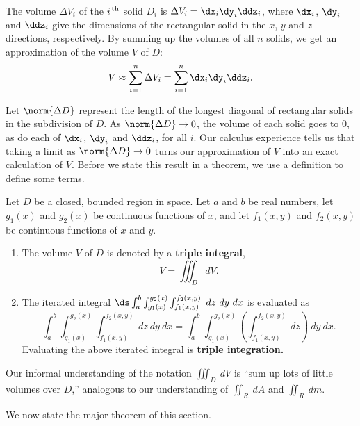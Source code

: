 The volume $\Delta V_i$ of the $i^\text{\,th}$ solid $D_i$ is $\Delta V_i = \dx_i\dy_i\ddz_i$, where $\dx_i$, $\dy_i$ and $\ddz_i$ give the dimensions of the rectangular solid in the $x$, $y$ and $z$ directions, respectively. By summing up the volumes of all $n$ solids, we get an approximation of the volume $V$ of $D$:
$$V \approx \sum_{i=1}^n \Delta V_i = \sum_{i=1}^n \dx_i\dy_i\ddz_i.$$

Let $\norm{\Delta D}$ represent the length of the longest diagonal of rectangular solids in the subdivision of $D$. As $\norm{\Delta D}\to 0$, the volume of each solid goes to 0, as do each of $\dx_i$, $\dy_i$ and $\ddz_i$, for all $i$. Our calculus experience tells us that taking a limit as $\norm{\Delta D}\to 0$ turns our approximation of $V$ into an exact calculation of $V$. Before we state this result in a theorem, we use a definition to define some terms.

{Let $D$ be a closed, bounded region in space. Let $a$ and $b$ be real numbers, let $g_1(x)$ and $g_2(x)$ be continuous functions of $x$, and let $f_1(x,y)$ and $f_2(x,y)$ be continuous functions of $x$ and $y$.
\begin{enumerate}
	\item	The volume $V$ of $D$ is denoted by a \textbf{triple integral},
	$$V = \iiint_D dV.$$
	
	\item The iterated integral $\ds \int_a^b\int_{g_1(x)}^{g_2(x)}\int_{f_1(x,y)}^{f_2(x,y)} \ dz\ dy\ dx$ is evaluated as 
	$$\int_a^b\int_{g_1(x)}^{g_2(x)}\int_{f_1(x,y)}^{f_2(x,y)} \ dz\ dy\ dx=\int_a^b\int_{g_1(x)}^{g_2(x)}\left(\int_{f_1(x,y)}^{f_2(x,y)} \ dz\right)\ dy\ dx.$$
	Evaluating the above iterated integral is \textbf{triple integration.}
\end{enumerate}}

Our informal understanding of the notation $\iiint_D\ dV$ is ``sum up lots of little volumes over $D$,'' analogous to our understanding of $\iint_R\ dA$ and $\iint_R\ dm$.

We now state the major theorem of this section.

